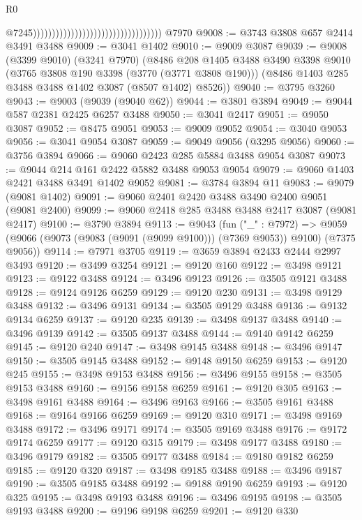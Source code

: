 \begin{lexlean}{R0}
\begin{coremodule}
                                                                        @7245))))))))))))))))))))))))))))))))))
    @7970
@9008 := @3743 @3808 @657 @2414 @3491 @3488
@9009 := @3041 @1402
@9010 := @9009 @3087
@9039 := @9008
    (@3399 @9010)
    (@3241 @7970)
    (@8486
      @208
      @1405
      @3488
      @3490
      @3398
      @9010
      (@3765 @3808 @190 @3398 (@3770 (@3771 @3808 @190)))
      (@8486 @1403 @285 @3488 @3488 @1402 @3087 (@8507 @1402) @8526))
@9040 := @3795 @3260
@9043 := @9003 (@9039 (@9040 @62))
@9044 := @3801 @3894
@9049 := @9044 @587 @2381 @2425 @6257 @3488
@9050 := @3041 @2417
@9051 := @9050 @3087
@9052 := @8475 @9051
@9053 := @9009 @9052
@9054 := @3040 @9053
@9056 := @3041 @9054 @3087
@9059 := @9049 @9056 (@3295 @9056)
@9060 := @3756 @3894
@9066 := @9060 @2423 @285 @5884 @3488 @9054 @3087
@9073 := @9044 @214 @161 @2422 @5882 @3488 @9053 @9054
@9079 := @9060 @1403 @2421 @3488 @3491 @1402 @9052
@9081 := @3784 @3894 @11
@9083 := @9079 (@9081 @1402)
@9091 := @9060 @2401 @2420 @3488 @3490 @2400 @9051 (@9081 @2400)
@9099 := @9060 @2418 @285 @3488 @3488 @2417 @3087 (@9081 @2417)
@9100 := @3790 @3894
@9113 := @9043
    (fun ("_" : @7972) =>
    @9059 (@9066 (@9073 (@9083 (@9091 (@9099 @9100))) (@7369 @9053)) @9100) (@7375 @9056))
@9114 := @7971 @3705
@9119 := @3659 @3894 @2433 @2444 @2997 @3493
@9120 := @3499 @3254
@9121 := @9120 @160
@9122 := @3498 @9121
@9123 := @9122 @3488
@9124 := @3496 @9123
@9126 := @3505 @9121 @3488
@9128 := @9124 @9126 @6259
@9129 := @9120 @230
@9131 := @3498 @9129 @3488
@9132 := @3496 @9131
@9134 := @3505 @9129 @3488
@9136 := @9132 @9134 @6259
@9137 := @9120 @235
@9139 := @3498 @9137 @3488
@9140 := @3496 @9139
@9142 := @3505 @9137 @3488
@9144 := @9140 @9142 @6259
@9145 := @9120 @240
@9147 := @3498 @9145 @3488
@9148 := @3496 @9147
@9150 := @3505 @9145 @3488
@9152 := @9148 @9150 @6259
@9153 := @9120 @245
@9155 := @3498 @9153 @3488
@9156 := @3496 @9155
@9158 := @3505 @9153 @3488
@9160 := @9156 @9158 @6259
@9161 := @9120 @305
@9163 := @3498 @9161 @3488
@9164 := @3496 @9163
@9166 := @3505 @9161 @3488
@9168 := @9164 @9166 @6259
@9169 := @9120 @310
@9171 := @3498 @9169 @3488
@9172 := @3496 @9171
@9174 := @3505 @9169 @3488
@9176 := @9172 @9174 @6259
@9177 := @9120 @315
@9179 := @3498 @9177 @3488
@9180 := @3496 @9179
@9182 := @3505 @9177 @3488
@9184 := @9180 @9182 @6259
@9185 := @9120 @320
@9187 := @3498 @9185 @3488
@9188 := @3496 @9187
@9190 := @3505 @9185 @3488
@9192 := @9188 @9190 @6259
@9193 := @9120 @325
@9195 := @3498 @9193 @3488
@9196 := @3496 @9195
@9198 := @3505 @9193 @3488
@9200 := @9196 @9198 @6259
@9201 := @9120 @330

\end{coremodule}
\end{lexlean}
